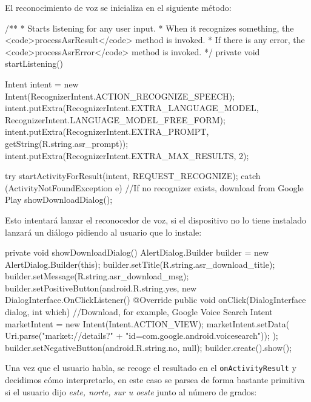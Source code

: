 \documentclass[	DIV=calc,%
							paper=a4,%
							fontsize=11pt]{scrartcl}	 					%
\begin{document}
El reconocimiento de voz se inicializa en el siguiente método:

\begin{javacode}
	/**
	 * Starts listening for any user input.
	 * When it recognizes something, the <code>processAsrResult</code> method is invoked.
	 * If there is any error, the <code>processAsrError</code> method is invoked.
	 */
	private void startListening() {
			Intent intent = new Intent(RecognizerIntent.ACTION_RECOGNIZE_SPEECH);
			intent.putExtra(RecognizerIntent.EXTRA_LANGUAGE_MODEL, RecognizerIntent.LANGUAGE_MODEL_FREE_FORM);
			intent.putExtra(RecognizerIntent.EXTRA_PROMPT, getString(R.string.asr_prompt));
			intent.putExtra(RecognizerIntent.EXTRA_MAX_RESULTS, 2);

			try {
					startActivityForResult(intent, REQUEST_RECOGNIZE);
			} catch (ActivityNotFoundException e) {
					//If no recognizer exists, download from Google Play
					showDownloadDialog();
			}
	}
\end{javacode}

Esto intentará lanzar el reconocedor de voz, si el dispositivo no lo
tiene instalado lanzará un diálogo pidiendo al usuario que lo instale:

\begin{javacode}
	private void showDownloadDialog() {
			AlertDialog.Builder builder =
							new AlertDialog.Builder(this);
			builder.setTitle(R.string.asr_download_title);
			builder.setMessage(R.string.asr_download_msg);
			builder.setPositiveButton(android.R.string.yes,
							new DialogInterface.OnClickListener() {
									@Override
									public void onClick(DialogInterface dialog,
																			int which) {
											//Download, for example, Google Voice Search
											Intent marketIntent =
															new Intent(Intent.ACTION_VIEW);
											marketIntent.setData(
															Uri.parse("market://details?"
																			+ "id=com.google.android.voicesearch"));
									}
							});
			builder.setNegativeButton(android.R.string.no, null);
			builder.create().show();
	}
\end{javacode}

Una vez que el usuario habla, se recoge el resultado en el
\texttt{onActivityResult} y decidimos cómo interpretarlo, en este caso
se parsea de forma bastante primitiva si el usuario dijo \emph{este,
norte, sur u oeste} junto al número de grados:
\end{document}
